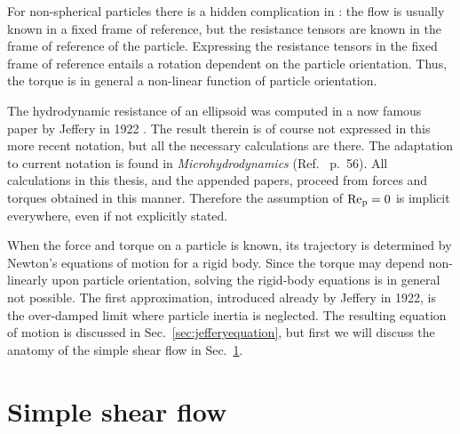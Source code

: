\documentclass[thesis.tex]{subfiles}
\begin{document}
For non-spherical particles there is a hidden complication in : the flow is usually known in a fixed frame of reference, but the resistance tensors are known in the frame of reference of the particle. Expressing the resistance tensors in the fixed frame of reference entails a rotation dependent on the particle orientation. Thus, the torque is in general a non-linear function of particle orientation.

The hydrodynamic resistance of an ellipsoid was computed in a now famous paper by Jeffery in 1922 \cite{jeffery1922}. The result therein is of course not expressed in this more recent notation, but all the necessary calculations are there. The adaptation to current notation is found in \emph{Microhydrodynamics} (Ref.~ p.~56). All calculations in this thesis, and the appended papers, proceed from forces and torques obtained in this manner. Therefore the assumption of $\mbox{Re}_{\mathrm p} = 0$ is implicit everywhere, even if not explicitly stated.

When the force and torque on a particle is known, its trajectory is determined by Newton's equations of motion for a rigid body. Since the torque may depend non-linearly upon particle orientation, solving the rigid-body equations is in general not possible. The first approximation, introduced already by Jeffery in 1922, is the over-damped limit where particle inertia is neglected. The resulting equation of motion is discussed in Sec.~\ref{sec:jefferyequation}, but first we will discuss the anatomy of the simple shear flow in Sec.~\ref{sec:shearflow}.

\section{Simple shear flow}\label{sec:shearflow}
\end{document}
